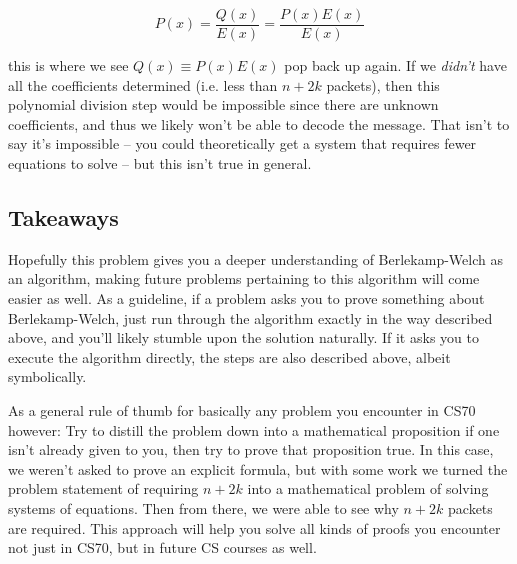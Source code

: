 \documentclass[10pt]{article}
\begin{document}
    \[ P(x) = \frac{Q(x)}{E(x)} = \frac{P(x) E(x)}{E(x)}\] 

    this is where we see $Q(x) \equiv P(x) E(x)$ pop back up again. If we \textit{didn't} have all the coefficients determined (i.e. less than $n+2k$ packets), then this polynomial division step would be impossible since there are unknown coefficients, and thus we likely won't be able to decode the message. That isn't to say it's 
	impossible -- you could theoretically get a system that requires fewer equations to solve -- but this isn't true
	in general. 

    \subsection*{Takeaways}

    Hopefully this problem gives you a deeper understanding of Berlekamp-Welch as an algorithm, making future problems pertaining to this algorithm will come easier as well. As a guideline, if a problem asks you to prove something about Berlekamp-Welch, just run through the algorithm exactly in the way described above, and you'll likely stumble upon the solution naturally. If it asks you to execute the algorithm directly, the steps are also described above, albeit symbolically.

    As a general rule of thumb for basically any problem you encounter in CS70 however: Try to distill the problem down into a mathematical proposition if one isn't already given to you, then try to prove that proposition true. In this case, we weren't asked to prove an explicit formula, but with some work we turned the problem statement of requiring $n+2k$ into a mathematical problem of solving systems of equations. Then from there, we were able to see why $n+2k$ packets are required. This approach will help you solve all kinds of proofs you encounter not just in CS70, but in future CS courses as well.
    
\end{document}
